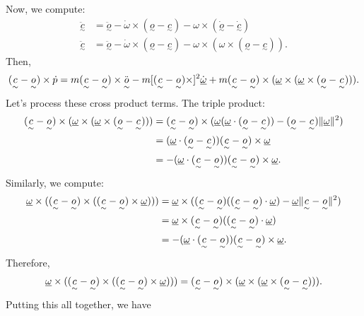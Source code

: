\documentclass[11pt]{article}
\newcommand{\utilde}[1]{\underset{\sim}{#1}}
\begin{document}
\begin{enumerate}
        Now, we compute:
        \begin{align*}
            \ddot{\utilde{c}} &= \ddot{\utilde{o}} - \dot{\omega} \times (\utilde{o} - \utilde{c}) - \omega \times (\dot{\utilde{o}} - \dot{\utilde{c}})\\
            \ddot{\utilde{c}} &= \ddot{\utilde{o}} - \dot{\omega} \times (\utilde{o} - \utilde{c}) - \omega \times (\omega \times  (\utilde{o} - \utilde{c}))
        .\end{align*}
        Then,
        \begin{align*}
            (\utilde{c} - \utilde{o}) \times \dot{p} = m(\utilde{c} - \utilde{o}) \times \ddot{\utilde{o}}  - m[(\utilde{c} - \utilde{o}) \times ]^2 \dot{\uline{\omega}} + m(\utilde{c} - \utilde{o}) \times ( \uline{\omega} \times  (\uline{\omega} \times (\utilde{o } - \utilde{c})))
        .\end{align*}
        Let's process these cross product terms.
        The triple product:
        \begin{align*}
            (\utilde{c} - \utilde{o}) \times  (\uline{\omega} \times ( \uline{\omega} \times  (\utilde{o} - \utilde{c})) ) &= (\utilde{c} - \utilde{o}) \times (\uline{\omega}(\uline{\omega}\cdot (\utilde{o} - \utilde{c})) - (\utilde{o} - \utilde{c}) \|\uline{\omega}\|^2)\\
                                                                                                                           &=(\uline{\omega} \cdot (\utilde{o} - \utilde{c})) (\utilde{c} - \utilde{o}) \times  \uline{\omega}\\
                                                                                                                           &=-(\uline{\omega} \cdot (\utilde{c} - \utilde{o})) (\utilde{c} - \utilde{o}) \times  \uline{\omega}
        .\end{align*}
        Similarly, we compute:
        \begin{align*}
            \uline{\omega} \times ((\utilde{c} - \utilde{o}) \times  ((\utilde{c} - \utilde{o}) \times \uline{\omega}))) &=  \uline{\omega} \times  ((\utilde{c} - \utilde{o})((\utilde{c} - \utilde{o}) \cdot  \uline{\omega}) - \uline{\omega} \|\utilde{c} - \utilde{o}\|^2) \\
                                                                                                                         &= \uline{\omega} \times (\utilde{c} - \utilde{o}) ((\utilde{c} - \utilde{o}) \cdot  \uline{\omega}) \\
                                                                                                                         &= - (\uline{\omega} \cdot  (\utilde{c} - \utilde{o})) (\utilde{c} - \utilde{o}) \times  \uline{\omega}
        .\end{align*}
        Therefore,
        \[
        \uline{\omega} \times ((\utilde{c} - \utilde{o}) \times  ((\utilde{c} - \utilde{o}) \times \uline{\omega})))=
            (\utilde{c} - \utilde{o}) \times  (\uline{\omega} \times ( \uline{\omega} \times  (\utilde{o} - \utilde{c})) )
        .\] 
        Putting this all together, we have


\end{enumerate}
\end{document}
